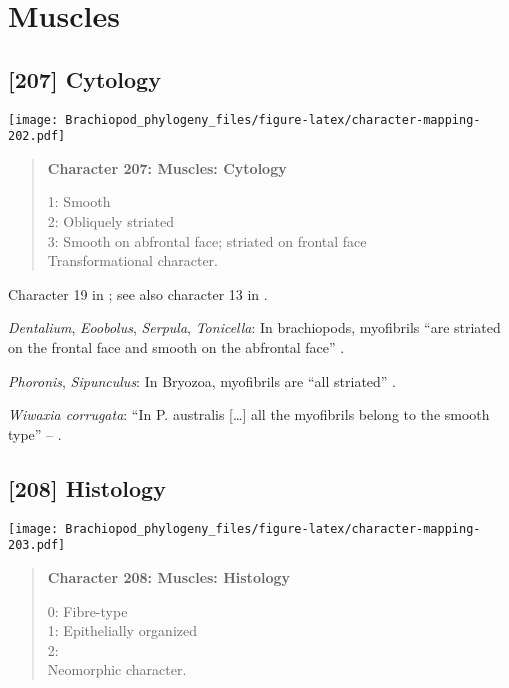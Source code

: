 \documentclass[openany]{book}
\theoremstyle{definition}
\theoremstyle{definition}
\theoremstyle{definition}
\theoremstyle{remark}
\begin{document}
\section{Muscles}\label{muscles}

\subsection*{{[}207{]} Cytology}\label{cytology}

\texttt{[image: Brachiopod\_phylogeny\_files/figure-latex/character-mapping-202.pdf]}

\begin{quote}
\textbf{Character 207: Muscles: Cytology}

1: Smooth\\
2: Obliquely striated\\
3: Smooth on abfrontal face; striated on frontal face\\
Transformational character.
\end{quote}

Character 19 in \citet{Haszprunar1996}; see also character 13 in
\citet{Haszprunar2000}.

\hypertarget{Dentalium-coding-207}{}
\emph{Dentalium}, \emph{Eoobolus}, \emph{Serpula}, \emph{Tonicella}: In
brachiopods, myofibrils ``are striated on the frontal face and smooth on
the abfrontal face'' \citep{Pardos1991}.

\hypertarget{Phoronis-coding-207}{}
\emph{Phoronis}, \emph{Sipunculus}: In Bryozoa, myofibrils are ``all
striated'' \citep{Pardos1991}.

\hypertarget{Wiwaxia_corrugata-coding-207}{}
\emph{Wiwaxia corrugata}: ``In P. australis {[}\ldots{}{]} all the
myofibrils belong to the smooth type'' -- \citet{Pardos1991}.

\subsection*{{[}208{]} Histology}\label{histology}

\texttt{[image: Brachiopod\_phylogeny\_files/figure-latex/character-mapping-203.pdf]}

\begin{quote}
\textbf{Character 208: Muscles: Histology}

0: Fibre-type\\
1: Epithelially organized\\
2:\\
Neomorphic character.
\end{quote}
\end{document}

